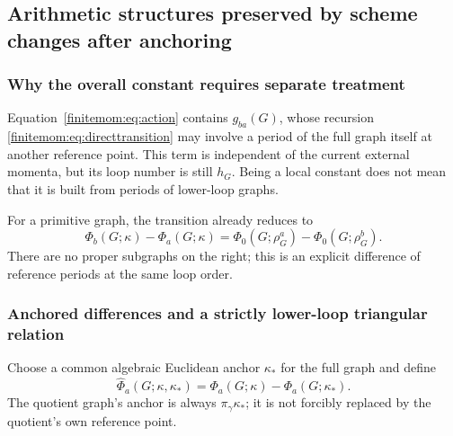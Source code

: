 \documentclass[11pt,a4paper,oneside]{article}
\theoremstyle{plain}
\theoremstyle{definition}
\theoremstyle{remark}
\numberwithin{equation}{section}
\begin{document}
\subsection{Arithmetic structures preserved by scheme changes after anchoring}
\subsubsection{Why the overall constant requires separate treatment}
Equation~\eqref{finitemom:eq:action} contains $g_{ba}(G)$, whose recursion \eqref{finitemom:eq:directtransition} may involve a period of the full graph itself at another reference point.
This term is independent of the current external momenta, but its loop number is still $h_G$.
Being a local constant does not mean that it is built from periods of lower-loop graphs.

For a primitive graph, the transition already reduces to
\begin{equation}\label{finitemom:eq:primitive}
 \Phi_b(G;\kappa)-\Phi_a(G;\kappa)
   =\Phi_0(G;\rho_G^a)-\Phi_0(G;\rho_G^b).
\end{equation}
There are no proper subgraphs on the right; this is an explicit difference of reference periods at the same loop order.

\subsubsection{Anchored differences and a strictly lower-loop triangular relation}
Choose a common algebraic Euclidean anchor $\kappa_*$ for the full graph and define
\begin{equation}\label{finitemom:eq:anchor}
 \widehat\Phi_a(G;\kappa,\kappa_*)
       =\Phi_a(G;\kappa)-\Phi_a(G;\kappa_*).
\end{equation}
The quotient graph's anchor is always $\pi_\gamma\kappa_*$; it is not forcibly replaced by the quotient's own reference point.
\end{document}
